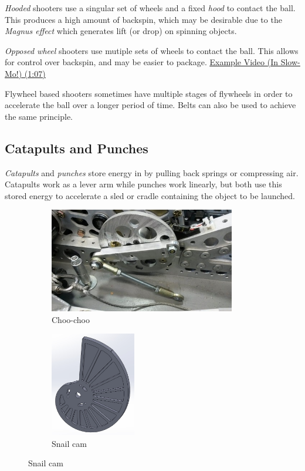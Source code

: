 \textit{Hooded} shooters use a singular set of wheels and a fixed \textit{hood} to contact the ball. This produces a high amount of backspin, which may be desirable due to the \textit{Magnus effect} which generates lift (or drop) on spinning objects.

\textit{Opposed wheel} shooters use mutiple sets of wheels to contact the ball. This allows for control over backspin, and may be easier to package. \href{https://youtu.be/pgMU_AxzxAE?t=67}{\color{red}\underline{Example Video (In Slow-Mo!) (1:07)}}

Flywheel based shooters sometimes have multiple stages of flywheels in order to accelerate the ball over a longer period of time. Belts can also be used to achieve the same principle.

\subsection{Catapults and Punches}
\textit{Catapults} and \textit{punches} store energy in by pulling back springs or compressing air. Catapults work as a lever arm while punches work linearly, but both use this stored energy to accelerate a sled or cradle containing the object to be launched.

\begin{figure}[H]
\begin{subfigure}[b]{.32\linewidth}
	\includegraphics[height=1.8in]{imgs/choo_choo.jpeg}
	\caption{Choo-choo}
\end{subfigure}\begin{subfigure}[b]{.32\linewidth}
	\includegraphics[height=1.8in]{imgs/snail_cam.jpeg}
	\caption{Snail cam}
\end{subfigure}
\end{figure}

